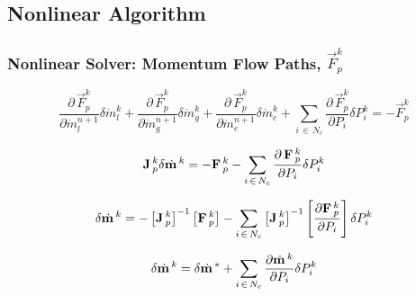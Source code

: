 \documentclass[compress,xcolor=table]{beamer}
\begin{document}
\subsection[Nonlinear Algorithm]{Nonlinear Algorithm}
\begin{frame}
\frametitle{Nonlinear Solver: Momentum Flow Paths, $\vec{F}^{k}_{p}$}
\begin{equation*}
\frac{\partial\, \vec{F}^{k}_{p}}{\partial \dot{m}^{n+1}_{l}} \delta \dot{m}_{l}^{k} + \frac{\partial\, \vec{F}^{k}_{p}}{\partial \dot{m}^{n+1}_{g}} \delta \dot{m}_{g}^{k} + \frac{\partial\, \vec{F}^{k}_{p}}{\partial \dot{m}^{n+1}_{e}} \delta \dot{m}_{e}^{k} + \sum_{i\, \in \, N_{c}} \frac{\partial\, \vec{F}^{k}_{p}}{\partial P_{i}} \delta P_{i}^{k} = - \vec{F}^{k}_{p}
\end{equation*}

\begin{equation*}
\vec{J}^{k}_{p} \delta \momVec{}^{k}  = - \vec{F}^{k}_{p} - \sum_{i\, \in \, N_{c}} \frac{\partial\, \vec{F}^{k}_{p}}{\partial P_{i}} \delta P_{i}^{k}
\end{equation*}

\begin{equation*}
\delta \momVec{}^{k} = - \left[\vec{J}_{p}^{k}\right]^{-1} \left[\vec{F}^{k}_{p} \right] - \sum_{i \, \in \, N_{c} } \left[\vec{J}^{k}_{p}\right]^{-1} \left[\frac{\partial \vec{F}^{k}_{p}}{\partial P_{i}}\right] \delta P^{k}_{i}
\end{equation*}

\begin{equation*}
\delta \momVec{}^{k} = \delta \momVec{}^{*} + \sum_{i \, \in \, N_{c} } \frac{\partial \momVec{}^{k}}{\partial P_{i}} \delta P^{k}_{i}
\end{equation*}

\end{frame}
\end{document}

